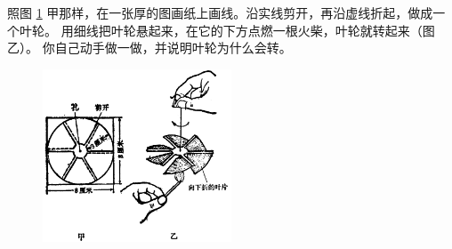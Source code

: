 照图 \ref{fig:2-18} 甲那样，在一张厚的图画纸上画线。沿实线剪开，再沿虚线折起，做成一个叶轮。
用细线把叶轮悬起来，在它的下方点燃一根火柴，叶轮就转起来（图乙）。
你自己动手做一做，并说明叶轮为什么会转。

\begin{figure}[htbp]
    \centering
    \includegraphics[width=0.5\textwidth]{../pic/czwl2-ch2-18}
    \caption{}\label{fig:2-18}
\end{figure}


